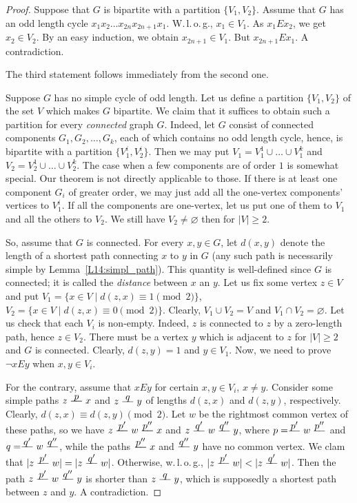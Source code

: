 \documentclass[12pt,notitlepage]{article}
\theoremstyle{plain}
\theoremstyle{definition}
\theoremstyle{plain}
\newcommand{\void}{\varnothing}
\newcommand{\1}{\mathbf{1}}
\newcommand{\0}{\mathbf{0}}
\newcommand{\pth}[1]{\overset{\raisebox{0.25em}{$ #1 $}}{\relbar\hspace{-.8mm}\relbar}}
\begin{document}
\begin{proof}
Suppose that $G$ is bipartite with a partition $\{V_1, V_2\}$. Assume that $G$ has an odd length cycle $x_1 x_2 \ldots x_{2n} x_{2n + 1} x_1$. W.\,l.\,o.\,g., $x_1 \in V_1$. As $x_1 E x_2$, we get $x_2 \in V_2$. By an easy induction, we obtain $x_{2n + 1} \in V_1$. But $x_{2n + 1} E x_1$. A contradiction.

The third statement follows immediately from the second one.

Suppose $G$ has no simple cycle of odd length. Let us define a partition $\{V_1, V_2\}$ of the set $V$ which makes $G$ bipartite. We claim that it suffices to obtain such a partition for every \emph{connected} graph $G$. Indeed, let $G$ consist of connected components $G_1, G_2, \ldots, G_k$, each of which contains no odd length cycle, hence, is bipartite with a partition $\{V^i_1, V^i_2\}$. Then we may put $V_1 = V^1_1 \cup \ldots \cup V^k_1$ and $V_2 = V^1_2 \cup \ldots \cup V^k_2$. The case when a few components are of order $1$ is somewhat special. Our theorem is not directly applicable to those. If there is at least one component $G_i$ of greater order, we may just add all the one-vertex components' vertices to $V^i_1$. If all the components are one-vertex, let us put one of them to $V_1$ and all the others to $V_2$. We still have $V_2  \neq \void$ then for $|V| \geq 2$.

So, assume that $G$ is connected. For every $x, y \in G$, let $d(x,y)$ denote the length of a shortest path connecting $x$ to $y$ in $G$ (any such path is necessarily simple by Lemma~\ref{L14:simpl_path}). This quantity is well-defined since $G$ is connected; it is called the \emph{distance} between $x$ an $y$. Let us fix some vertex $z \in V$ and put $V_1 = \{ x \in V \mid d(z,x) \equiv 1 \pmod 2 \}$, $V_2 = \{ x \in V \mid d(z,x) \equiv 0 \pmod 2 \}$. Clearly, $V_1 \cup V_2 = V$ and $V_1 \cap V_2 = \void$. Let us check that each $V_i$ is non-empty. Indeed, $z$ is connected to $z$ by a zero-length path, hence $z \in V_2$. There must be a vertex $y$ which is adjacent to $z$ for $|V| \geq 2$ and $G$ is connected. Clearly, $d(z, y) = 1$ and $y \in V_1$. Now, we need to prove $\neg x E y$ when $x, y \in V_i$.

For the contrary, assume that $x E y$ for certain $x, y \in V_i$, $x \neq y$. Consider some simple paths $z \pth{p} x$ and $z \pth{q} y$ of lengths $d(z,x)$ and $d(z,y)$, respectively. Clearly, $d(z,x) \equiv d(z,y) \pmod 2$. Let $w$ be the rightmost common vertex of these paths, so we have $z \pth{p'} w \pth{p''} x$ and $z \pth{q'} w \pth{q''} y$, where $p = \pth{p'} w \pth{p''}$ and $q = \pth{q'} w \pth{q''}$, while the paths $\pth{p''} x$ and $\pth{q''} y$ have no common vertex. We clam that $|z \pth{p'} w| = |z \pth{q'} w|$. Otherwise, w.\,l.\,o.\,g., $|z \pth{p'} w| < |z \pth{q'} w|$. Then the path $z \pth{p'} w \pth{q''} y$ is shorter than $z \pth{q} y$, which is supposedly a shortest path between $z$ and $y$. A contradiction.


\end{proof}
\end{document}
